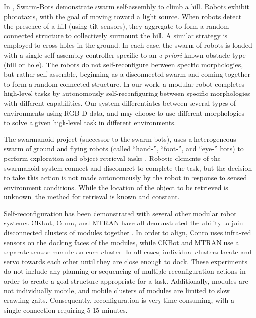 \documentclass[journal]{IEEEtran}
\begin{document}
%
In \cite{o2010self}, Swarm-Bots demonstrate swarm self-assembly to climb a hill.  Robots exhibit phototaxis, with the goal of moving toward a light source.  When robots detect the presence of a hill (using tilt sensors), they aggregate to form a random connected structure to collectively surmount the hill. A similar strategy is employed to cross holes in the ground.  In each case, the swarm of robots is loaded with a single self-assembly controller specific to an \textit{a priori} known obstacle type (hill or hole).  The robots do not self-reconfigure between specific morphologies, but rather self-assemble, beginning as a disconnected swarm and coming together to form a random connected structure.  In our work, a modular robot completes high-level tasks by autonomously self-reconfiguring between specific morphologies with different capabilities.  Our system differentiates between several types of environments using RGB-D data, and may choose to use different morphologies to solve a given high-level task in different environments.    
 
The swarmanoid project (successor to the swarm-bots), uses a heterogeneous swarm of ground and flying robots (called ``hand-'', ``foot-'', and ``eye-'' bots) to perform exploration and object retrieval tasks  \cite{Dorigo2013}. Robotic elements of the swarmanoid system connect and disconnect to complete the task, but the decision to take this action is not made autonomously by the robot in response to sensed environment conditions. While the location of the object to be retrieved is unknown, the method for retrieval is known and constant.

Self-reconfiguration has been demonstrated with several other modular robot systems. CKbot, Conro, and MTRAN have all demonstrated the ability to join disconnected clusters of modules together \cite{Yim2007, Rubenstein2004,Murata2006}. In order to align, Conro uses infra-red sensors on the docking faces of the modules, while CKBot and MTRAN use a separate sensor module on each cluster.  In all cases, individual clusters locate and servo towards each other until they are close enough to dock. These experiments do not include any planning or sequencing of multiple reconfiguration actions in order to create a goal structure appropriate for a task.  Additionally,  modules are not individually mobile, and mobile clusters of modules are limited to slow crawling gaits.  Consequently, reconfiguration is very time consuming, with a single connection requiring 5-15 minutes.
\end{document}
